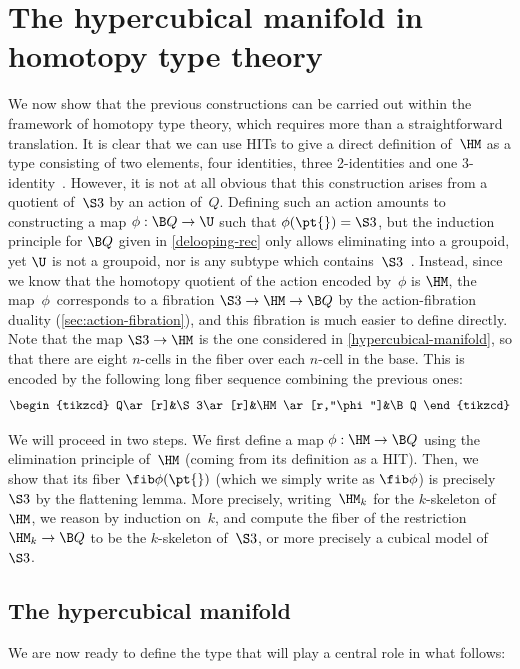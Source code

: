 \documentclass[a4paper]{article}
\newcommand{\citep}{\cite}
\begin{document}
\section{The hypercubical manifold in homotopy type theory}
\label{hypercubical-hott}
We now show that the previous constructions can be carried out within the framework of homotopy type theory, which requires more than a straightforward translation. It is clear that we can use HITs to give a direct definition of~$\HM$ as a type consisting of two elements, four identities, three 2-identities and one 3-identity~\citep{dylan}. However, it is not at all obvious that this construction arises from a quotient of~$\S3$ by an action of~$Q$. Defining such an action amounts to constructing a map $\phi:\B Q\to\U$ such that $\phi(\pt{})=\S3$, but the induction principle for $\B Q$ given in \cref{delooping-rec} only allows eliminating into a groupoid, yet $\U$ is not a groupoid, nor is any subtype which contains~$\S3$~\cite[Corollary 6.4.3]{hottbook}.
Instead, since we know that the homotopy quotient of the action encoded by~$\phi$ is $\HM$, the map~$\phi$~corresponds to a fibration $\S3\to\HM\to\B Q$ by the action-fibration duality (\cref{sec:action-fibration}), and this fibration is much easier to define directly. Note that the map $\S3\to\HM$ is the one considered in \cref{hypercubical-manifold}, so that there are eight $n$-cells in the fiber over each $n$-cell in the base. This is encoded by the following long fiber sequence combining the previous ones:
\[
  \begin{tikzcd}
    Q\ar[r]&\S3\ar[r]&\HM\ar[r,"\phi"]&\B Q
  \end{tikzcd}
\]

We will proceed in two steps. We first define a map $\phi:\HM\to\B Q$ using the elimination principle of~$\HM$ (coming from its definition as a HIT). Then, we show that its fiber $\fib\phi(\pt{})$ (which we simply write as $\fib\phi$) is precisely $\S3$ by the flattening lemma. More precisely, writing~$\HM_k$ for the $k$-skeleton of~$\HM$, we reason by induction on~$k$, and compute the fiber of the restriction $\HM_k\to\B Q$ to be the $k$-skeleton of~$\S3$, or more precisely a cubical model of~$\S3$.

\subsection{The hypercubical manifold}
We are now ready to define the type that will play a central role in what follows:
\end{document}
